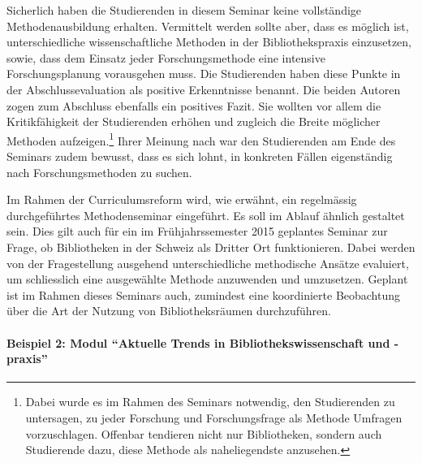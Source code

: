 \documentclass[a4paper,
fontsize=11pt,
oneside,
numbers=noperiodatend,
parskip=half-,
bibliography=totoc,
final
]{scrartcl}
\begin{document}
Sicherlich haben die Studierenden in diesem Seminar keine vollständige
Methodenausbildung erhalten. Vermittelt werden sollte aber, dass es
möglich ist, unterschiedliche wissenschaftliche Methoden in der
Bibliothekspraxis einzusetzen, sowie, dass dem Einsatz jeder
Forschungsmethode eine intensive Forschungsplanung vorausgehen muss. Die
Studierenden haben diese Punkte in der Abschlussevaluation als positive
Erkenntnisse benannt. Die beiden Autoren zogen zum Abschluss ebenfalls
ein positives Fazit. Sie wollten vor allem die Kritikfähigkeit der
Studierenden erhöhen und zugleich die Breite möglicher Methoden
aufzeigen.\footnote{Dabei wurde es im Rahmen des Seminars notwendig, den
  Studierenden zu untersagen, zu jeder Forschung und Forschungsfrage als
  Methode Umfragen vorzuschlagen. Offenbar tendieren nicht nur
  Bibliotheken, sondern auch Studierende dazu, diese Methode als
  naheliegendste anzusehen.} Ihrer Meinung nach war den Studierenden am
Ende des Seminars zudem bewusst, dass es sich lohnt, in konkreten Fällen
eigenständig nach Forschungsmethoden zu suchen.

Im Rahmen der Curriculumsreform wird, wie erwähnt, ein regelmässig
durchgeführtes Methodenseminar eingeführt. Es soll im Ablauf ähnlich
gestaltet sein. Dies gilt auch für ein im Frühjahrssemester 2015
geplantes Seminar zur Frage, ob Bibliotheken in der Schweiz als Dritter
Ort funktionieren. Dabei werden von der Fragestellung ausgehend
unterschiedliche methodische Ansätze evaluiert, um schliesslich eine
ausgewählte Methode anzuwenden und umzusetzen. Geplant ist im Rahmen
dieses Seminars auch, zumindest eine koordinierte Beobachtung über die
Art der Nutzung von Bibliotheksräumen durchzuführen.

\paragraph{Beispiel 2: Modul \enquote{Aktuelle Trends in
Bibliothekswissenschaft und
-praxis}}\label{beispiel-2-modul-aktuelle-trends-in-bibliothekswissenschaft-und--praxis}
\end{document}
